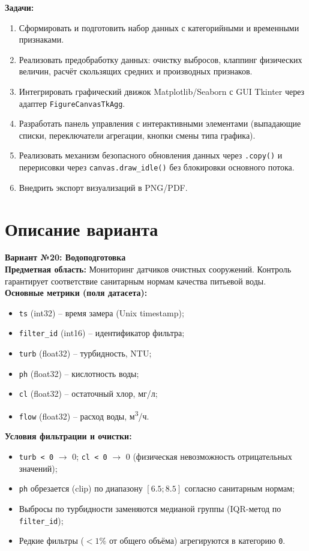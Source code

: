 \documentclass[oneside,a4paper,14pt]{extarticle} %
\begin{document}
\textbf{Задачи:}
\begin{enumerate}
    \item Сформировать и подготовить набор данных с категорийными и временными признаками.
    \item Реализовать предобработку данных: очистку выбросов, клаппинг физических величин, расчёт скользящих средних и производных признаков.
    \item Интегрировать графический движок Matplotlib/Seaborn с GUI Tkinter через адаптер \texttt{FigureCanvasTkAgg}.
    \item Разработать панель управления с интерактивными элементами (выпадающие списки, переключатели агрегации, кнопки смены типа графика).
    \item Реализовать механизм безопасного обновления данных через \texttt{.copy()} и перерисовки через \texttt{canvas.draw\_idle()} без блокировки основного потока.
    \item Внедрить экспорт визуализаций в PNG/PDF.
\end{enumerate}

\newpage
\section{Описание варианта}
\textbf{Вариант №20: Водоподготовка}\\
\textbf{Предметная область:} Мониторинг датчиков очистных сооружений. Контроль гарантирует соответствие санитарным нормам качества питьевой воды.\\
\textbf{Основные метрики (поля датасета):}
\begin{itemize}
    \item \texttt{ts} (int32) -- время замера (Unix timestamp);
    \item \texttt{filter\_id} (int16) -- идентификатор фильтра;
    \item \texttt{turb} (float32) -- турбидность, NTU;
    \item \texttt{ph} (float32) -- кислотность воды;
    \item \texttt{cl} (float32) -- остаточный хлор, мг/л;
    \item \texttt{flow} (float32) -- расход воды, м\textsuperscript{3}/ч.
\end{itemize}

\textbf{Условия фильтрации и очистки:}
\begin{itemize}
    \item \texttt{turb < 0} $\rightarrow$ 0; \texttt{cl < 0} $\rightarrow$ 0 (физическая невозможность отрицательных значений);
    \item \texttt{ph} обрезается (clip) по диапазону $[6.5; 8.5]$ согласно санитарным нормам;
    \item Выбросы по турбидности заменяются медианой группы (IQR-метод по \texttt{filter\_id});
    \item Редкие фильтры ($<1\%$ от общего объёма) агрегируются в категорию \texttt{0}.
\end{itemize}
\end{document}
